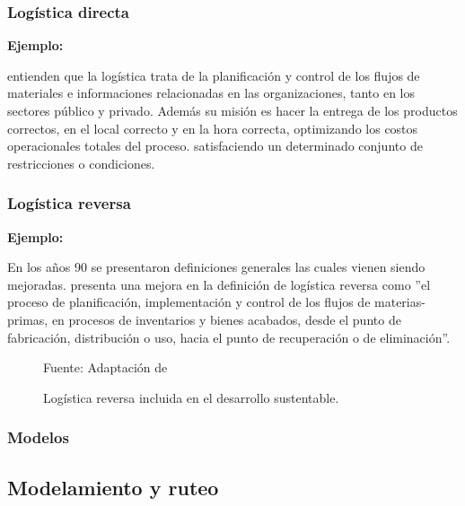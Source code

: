 \subsubsection{Logística directa}

{\bf Ejemplo:}\par

\cite{Ghiani} entienden que la logística trata de la planificación y control de los flujos de materiales e informaciones relacionadas en las organizaciones, tanto en los sectores público y privado. Además su misión es hacer la entrega de los productos correctos, en el local correcto y en la hora correcta, optimizando los costos operacionales totales del proceso.
satisfaciendo un determinado conjunto de restricciones o condiciones.\par

\subsubsection{Logística reversa}

{\bf Ejemplo:}\par

En los años 90 se presentaron definiciones generales las cuales vienen siendo mejoradas. \cite{Dekker} presenta una mejora en la definición de logística reversa como  ”el proceso de planificación, implementación y control de los flujos de materias-primas, en procesos de inventarios y bienes acabados, desde el punto de fabricación, distribución o uso, hacia el punto de recuperación o de eliminación”. 
\begin{figure}[ht]
\begin{center}
\end{center}
\begin{center}
\vskip -0.5cm
\caption{\small{Logística reversa incluida en el desarrollo sustentable.}}
{\small{Fuente: Adaptación de \cite{Tanguay}}}
\end{center}
\end{figure}


\subsubsection{Modelos}

\subsection{Modelamiento y ruteo }

